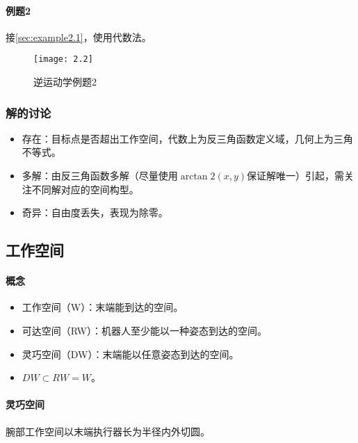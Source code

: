 \documentclass[
12pt, %
a4paper, 
oneside, %
headinclude,footinclude, %
]{scrartcl}
\begin{document}
\paragraph{例题2}\label{sec:example2.2}
接\ref{sec:example2.1}，使用代数法。
\begin{figure}[H]
\centering 
\texttt{[image: 2.2]} 
\caption[逆运动学例题2]{逆运动学例题2}
\end{figure}
\subsubsection{解的讨论}
\begin{itemize}
\item 存在：目标点是否超出工作空间，代数上为反三角函数定义域，几何上为三角不等式。
\item 多解：由反三角函数多解（尽量使用$ \arctan2(x, y) $保证解唯一）引起，需关注不同解对应的空间构型。
\item 奇异：自由度丢失，表现为除零。
\end{itemize} 
\subsection{工作空间}
\paragraph{概念}
\begin{itemize}
\item 工作空间（W）：末端能到达的空间。
\item 可达空间（RW）：机器人至少能以一种姿态到达的空间。
\item 灵巧空间（DW）：末端能以任意姿态到达的空间。
\item $ DW \subset RW = W $。
\end{itemize} 
\paragraph{灵巧空间}
腕部工作空间以末端执行器长为半径内外切圆。
\end{document}
